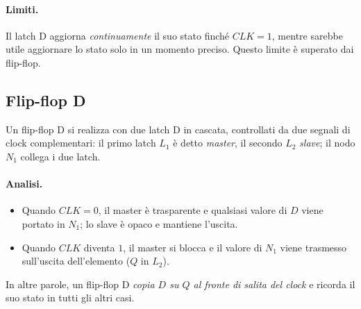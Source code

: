 \documentclass[11pt,a4paper]{article}
\begin{document}
\paragraph{Limiti.} Il latch D aggiorna \emph{continuamente} il suo stato finché $CLK = 1$, mentre sarebbe utile aggiornare lo stato solo in un momento preciso. Questo limite è superato dai flip-flop.

\subsection{Flip-flop D}

Un flip-flop D si realizza con due latch D in cascata, controllati da due segnali di clock complementari: il primo latch $L_1$ è detto \emph{master}, il secondo $L_2$ \emph{slave}; il nodo $N_1$ collega i due latch.

\begin{center}
\end{center}

\paragraph{Analisi.}
\begin{itemize}
  \item Quando $CLK = 0$, il master è trasparente e qualsiasi valore di $D$ viene portato in $N_1$; lo slave è opaco e mantiene l'uscita.
  \item Quando $CLK$ diventa $1$, il master si blocca e il valore di $N_1$ viene trasmesso sull'uscita dell'elemento ($Q$ in $L_2$).
\end{itemize}
In altre parole, un flip-flop D \emph{copia $D$ su $Q$ al fronte di salita del clock} e ricorda il suo stato in tutti gli altri casi.
\end{document}

